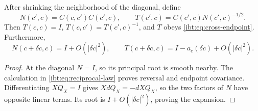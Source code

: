 After shrinking the neighborhood of the diagonal, define
\begin{equation}
 N(c',c)=C(c,c')C(c',c),\qquad
 T(c',c)=C(c',c)N(c',c)^{-1/2}.
 \label{ibt:eq:discrete-reciprocal}
\end{equation}
Then $T(c,c)=I$, $T(c,c')=T(c',c)^{-1}$, and $T$ obeys \cref{ibt:eq:cross-endpoint}. Furthermore,
\begin{equation}
 N(c+\delta c,c)=I+O(|\delta c|^2),\qquad
 T(c+\delta c,c)=I-a_c(\delta c)+O(|\delta c|^2).
 \label{ibt:eq:same-jet}
\end{equation}
\begin{proof}
At the diagonal $N=I$, so its principal root is smooth nearby. The calculation in \cref{ibt:eq:reciprocal-law} proves reversal and endpoint covariance. Differentiating $XQ_X=I$ gives $Xd Q_X=-d XQ_X$, so the two factors of $N$ have opposite linear terms. Its root is $I+O(|\delta c|^2)$, proving the expansion.
\end{proof}

